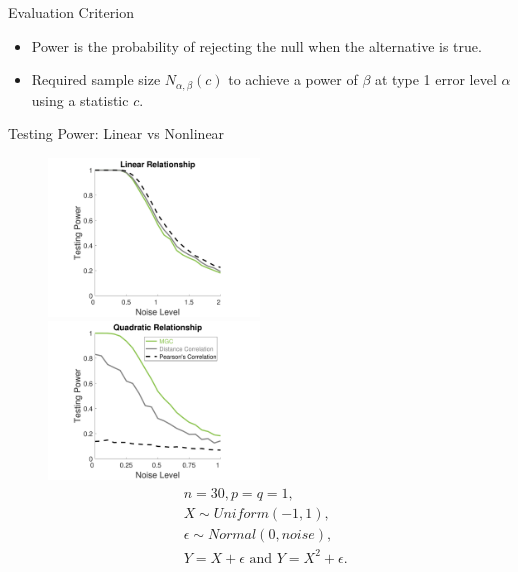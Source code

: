 \documentclass[mathserif,t]{beamer}
\newcommand{\Mgc}{MGC}
\newcommand{\mbx}{X}
\newcommand{\mby}{Y}
\begin{document}
\begin{frame}{Evaluation Criterion}
\begin{itemize}[<+->]
\item Power is the probability of rejecting the null when the alternative is true.
\item Required sample size $N_{\alpha,\beta}(c)$ to achieve a power of $\beta$ at type 1 error level $\alpha$ using a statistic $c$. 
\end{itemize}
\end{frame}

\begin{frame}{Testing Power: Linear vs Nonlinear}
\pause
\begin{figure}[!ht]
\centering
\includegraphics[width=0.5\textwidth,trim={1.5cm 0 0cm 0cm},clip]{FigNoiseT1}
\includegraphics[width=0.5\textwidth,trim={1.5cm 0 0cm 0cm},clip]{FigNoiseT6}
\label{f:noise}
\begin{align*}
& n=30, p=q=1, \\
& X \sim Uniform(-1,1),\\
& \epsilon \sim Normal(0, noise), \\
& Y=X+\epsilon \mbox{ and } Y=X^{2}+\epsilon.
\end{align*}
\end{figure}
\end{frame}
\end{document}
